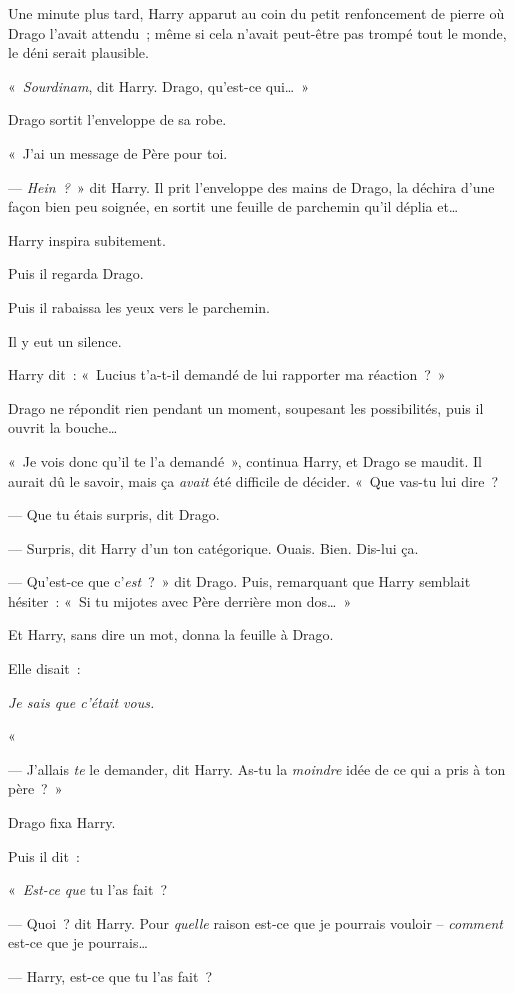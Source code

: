 Une minute plus tard, Harry apparut au coin du petit renfoncement de pierre où Drago l'avait attendu~; même si cela n'avait peut-être pas trompé tout le monde, le déni serait plausible.

«~\emph{Sourdinam}, dit Harry.
Drago, qu'est-ce qui…~»

Drago sortit l'enveloppe de sa robe.

«~J'ai un message de Père pour toi.

--- \emph{Hein~?}~» dit Harry.
Il prit l'enveloppe des mains de Drago, la déchira d'une façon bien peu soignée, en sortit une feuille de parchemin qu'il déplia et…

Harry inspira subitement.

Puis il regarda Drago.

Puis il rabaissa les yeux vers le parchemin.

Il y eut un silence.

Harry dit~: «~Lucius t'a-t-il demandé de lui rapporter ma réaction~?~»

Drago ne répondit rien pendant un moment, soupesant les possibilités, puis il ouvrit la bouche…

«~Je vois donc qu'il te l'a demandé~», continua Harry, et Drago se maudit.
Il aurait dû le savoir, mais ça \emph{avait} été difficile de décider.
«~Que vas-tu lui dire~?

--- Que tu étais surpris, dit Drago.

--- Surpris, dit Harry d'un ton catégorique.
Ouais. Bien.
Dis-lui ça.

--- Qu'est-ce que c'\emph{est}~?~»
dit Drago.
Puis, remarquant que Harry semblait hésiter~: «~Si tu mijotes avec Père derrière mon dos…~»

Et Harry, sans dire un mot, donna la feuille à Drago.

Elle disait~:

\emph{Je sais que c'était vous.}

«~\emph{}

--- J'allais \emph{te} le demander, dit Harry.
As-tu la \emph{moindre} idée de ce qui a pris à ton père~?~»

Drago fixa Harry.

Puis il dit~:

«~\emph{Est-ce que} tu l'as fait~?

--- Quoi~? dit Harry.
Pour \emph{quelle} raison est-ce que je pourrais vouloir -- \emph{comment} est-ce que je pourrais…

--- Harry, est-ce que tu l'as fait~?


